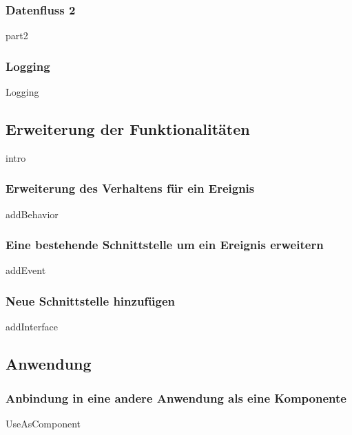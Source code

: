 \documentclass{article}
\begin{document}
            \subsubsection{Datenfluss \textbf{2}}
            {part2}

   \newpage
        \subsubsection{Logging}
                {Logging}


        \newpage
        \subsection{Erweiterung der Funktionalitäten}
            {intro}
    
            \subsubsection{Erweiterung des Verhaltens für ein Ereignis}
            \label{Verhalten für ein Ereignis erweitern}
                {addBehavior}
    
            \subsubsection{Eine bestehende Schnittstelle um ein Ereignis erweitern}
                {addEvent}
            \newpage
            \subsubsection{Neue Schnittstelle hinzufügen}
                {addInterface}


    \newpage
    \subsection{Anwendung}
        \subsubsection{Anbindung in eine andere Anwendung als eine Komponente}
        \label{kap:useFrameworkAndLibrary}
            {UseAsComponent}
\end{document}
